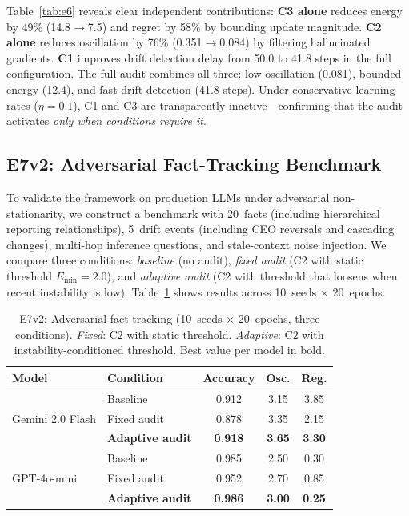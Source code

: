 \documentclass{article}
\begin{document}
Table~\ref{tab:e6} reveals clear independent contributions:
\textbf{C3 alone} reduces energy by 49\% (14.8$\to$7.5) and regret
by 58\% by bounding update magnitude.
\textbf{C2 alone} reduces oscillation by 76\% (0.351$\to$0.084) by
filtering hallucinated gradients.
\textbf{C1} improves drift detection delay from 50.0 to 41.8 steps
in the full configuration.
The full audit combines all three: low oscillation (0.081), bounded
energy (12.4), and fast drift detection (41.8 steps).
Under conservative learning rates ($\eta{=}0.1$), C1 and C3 are
transparently inactive---confirming
that the audit activates \emph{only when conditions require it}.


\subsection{E7v2: Adversarial Fact-Tracking Benchmark}
\label{sec:e7v2}

To validate the framework on production LLMs under adversarial
non-stationarity, we construct a benchmark with 20~facts (including
hierarchical reporting relationships), 5~drift events (including CEO
reversals and cascading changes), multi-hop inference questions, and
stale-context noise injection.
We compare three conditions: \emph{baseline} (no audit),
\emph{fixed audit} (C2 with static threshold $E_{\min}{=}2.0$),
and \emph{adaptive audit} (C2 with threshold that loosens when
recent instability is low).
Table~\ref{tab:e7v2} shows results across 10~seeds $\times$
20~epochs.

\begin{table}[t]
\centering
\caption{E7v2: Adversarial fact-tracking (10~seeds $\times$
  20~epochs, three conditions). \emph{Fixed}: C2 with static
  threshold. \emph{Adaptive}: C2 with instability-conditioned
  threshold. Best value per model in bold.}
\label{tab:e7v2}
\small
\begin{tabular}{@{}llccc@{}}
\toprule
\textbf{Model} & \textbf{Condition} & \textbf{Accuracy} & \textbf{Osc.} & \textbf{Reg.} \\
\midrule
\multirow{3}{*}{Gemini 2.0 Flash}
  & Baseline       & 0.912 & 3.15 & 3.85 \\
  & Fixed audit    & 0.878 & 3.35 & 2.15 \\
  & \textbf{Adaptive audit} & \textbf{0.918} & \textbf{3.65} & \textbf{3.30} \\
\midrule
\multirow{3}{*}{GPT-4o-mini}
  & Baseline       & 0.985 & 2.50 & 0.30 \\
  & Fixed audit    & 0.952 & 2.70 & 0.85 \\
  & \textbf{Adaptive audit} & \textbf{0.986} & \textbf{3.00} & \textbf{0.25} \\
\bottomrule
\end{tabular}
\end{table}
\end{document}
